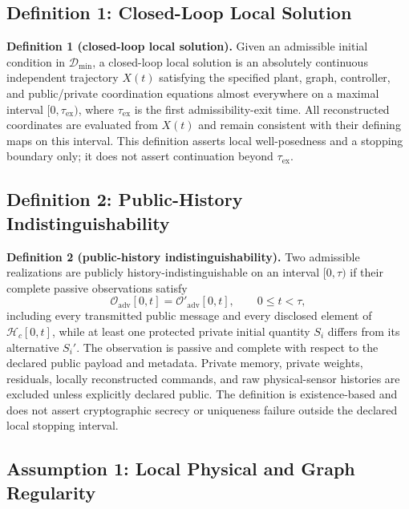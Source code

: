 \documentclass[journal]{IEEEtran}
\begin{document}
\subsection{Definition 1: Closed-Loop Local Solution}

\textbf{Definition 1 (closed-loop local solution).}
Given an admissible initial condition in $\mathcal D_{\min}$, a closed-loop local
solution is an absolutely continuous independent trajectory $X(t)$ satisfying
the specified plant, graph, controller, and public/private coordination equations
almost everywhere on a maximal interval $[0,\tau_{\mathrm{ex}})$, where
$\tau_{\mathrm{ex}}$ is the first admissibility-exit time. All reconstructed
coordinates are evaluated from $X(t)$ and remain consistent with their defining
maps on this interval. This definition asserts local well-posedness and a
stopping boundary only; it does not assert continuation beyond
$\tau_{\mathrm{ex}}$.

\subsection{Definition 2: Public-History Indistinguishability}

\textbf{Definition 2 (public-history indistinguishability).}
Two admissible realizations are publicly history-indistinguishable on an interval
$[0,\tau)$ if their complete passive observations satisfy
\begin{equation}
\mathcal O_{\mathrm{adv}}[0,t]=\mathcal O'_{\mathrm{adv}}[0,t],
\qquad 0\leq t<\tau,
\label{eq:definition_public_history}
\end{equation}
including every transmitted public message and every disclosed element of
$\mathcal H_c[0,t]$, while at least one protected private initial quantity
$S_i$ differs from its alternative $S_i'$. The observation is passive and
complete with respect to the declared public payload and metadata. Private
memory, private weights, residuals, locally reconstructed commands, and raw
physical-sensor histories are excluded unless explicitly declared public. The
definition is existence-based and does not assert cryptographic secrecy or
uniqueness failure outside the declared local stopping interval.

\subsection{Assumption 1: Local Physical and Graph Regularity}
\end{document}
